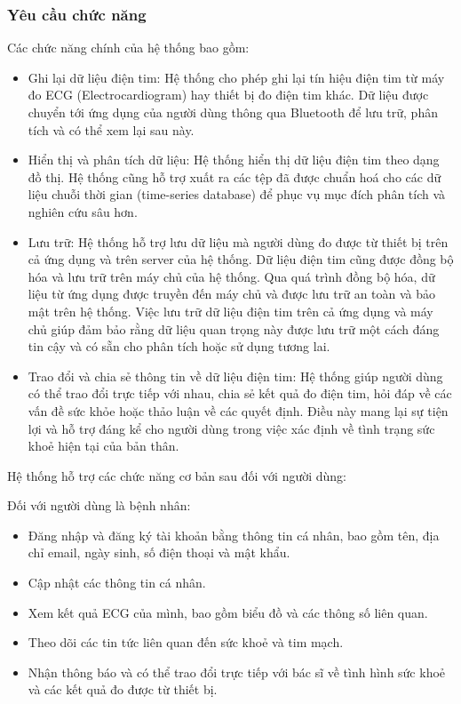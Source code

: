 \subsubsection{Yêu cầu chức năng}
Các chức năng chính của hệ thống bao gồm: 
\begin{itemize}
    \item Ghi lại dữ liệu điện tim: Hệ thống cho phép ghi lại tín hiệu điện tim từ máy đo ECG (Electrocardiogram) hay thiết bị đo điện tim khác. Dữ liệu được chuyển tới ứng dụng của người dùng thông qua Bluetooth để lưu trữ, phân tích và có thể xem lại sau này.

    \item Hiển thị và phân tích dữ liệu: Hệ thống hiển thị dữ liệu điện tim theo dạng đồ thị. Hệ thống cũng hỗ trợ xuất ra các tệp đã được chuẩn hoá cho các dữ liệu chuỗi thời gian (time-series database) để phục vụ mục đích phân tích và nghiên cứu sâu hơn.

    \item Lưu trữ: Hệ thống hỗ trợ lưu dữ liệu mà người dùng đo được từ thiết bị trên cả ứng dụng và trên server của hệ thống. Dữ liệu điện tim cũng được đồng bộ hóa và lưu trữ trên máy chủ của hệ thống. Qua quá trình đồng bộ hóa, dữ liệu từ ứng dụng được truyền đến máy chủ và được lưu trữ an toàn và bảo mật trên hệ thống. Việc lưu trữ dữ liệu điện tim trên cả ứng dụng và máy chủ giúp đảm bảo rằng dữ liệu quan trọng này được lưu trữ một cách đáng tin cậy và có sẵn cho phân tích hoặc sử dụng tương lai.

    \item Trao đổi và chia sẻ thông tin về dữ liệu điện tim: Hệ thống giúp người dùng có thể trao đổi trực tiếp với nhau, chia sẻ kết quả đo điện tim, hỏi đáp về các vấn đề sức khỏe hoặc thảo luận về các quyết định. Điều này mang lại sự tiện lợi và hỗ trợ đáng kể cho người dùng trong việc xác định về tình trạng sức khoẻ hiện tại của bản thân.
\end{itemize}
Hệ thống hỗ trợ các chức năng cơ bản sau đối với người dùng:

Đối với người dùng là bệnh nhân:
\begin{itemize}
    \item Đăng nhập và đăng ký tài khoản bằng thông tin cá nhân, bao gồm tên, địa chỉ email, ngày sinh, số điện thoại và mật khẩu.
    \item Cập nhật các thông tin cá nhân.
    \item Xem kết quả ECG của mình, bao gồm biểu đồ và các thông số liên quan.
    \item Theo dõi các tin tức liên quan đến sức khoẻ và tim mạch.
    \item Nhận thông báo và có thể trao đổi trực tiếp với bác sĩ về tình hình sức khoẻ và các kết quả đo được từ thiết bị.
\end{itemize}

